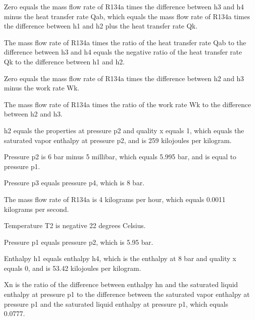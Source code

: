 Zero equals the mass flow rate of R134a times the difference between h3 and h4 minus the heat transfer rate Qab, which equals the mass flow rate of R134a times the difference between h1 and h2 plus the heat transfer rate Qk.

The mass flow rate of R134a times the ratio of the heat transfer rate Qab to the difference between h3 and h4 equals the negative ratio of the heat transfer rate Qk to the difference between h1 and h2.

Zero equals the mass flow rate of R134a times the difference between h2 and h3 minus the work rate Wk.

The mass flow rate of R134a times the ratio of the work rate Wk to the difference between h2 and h3.

h2 equals the properties at pressure p2 and quality x equals 1, which equals the saturated vapor enthalpy at pressure p2, and is 259 kilojoules per kilogram.

Pressure p2 is 6 bar minus 5 millibar, which equals 5.995 bar, and is equal to pressure p1.

Pressure p3 equals pressure p4, which is 8 bar.

The mass flow rate of R134a is 4 kilograms per hour, which equals 0.0011 kilograms per second.

Temperature T2 is negative 22 degrees Celsius.

Pressure p1 equals pressure p2, which is 5.95 bar.

Enthalpy h1 equals enthalpy h4, which is the enthalpy at 8 bar and quality x equals 0, and is 53.42 kilojoules per kilogram.

Xn is the ratio of the difference between enthalpy hn and the saturated liquid enthalpy at pressure p1 to the difference between the saturated vapor enthalpy at pressure p1 and the saturated liquid enthalpy at pressure p1, which equals 0.0777.